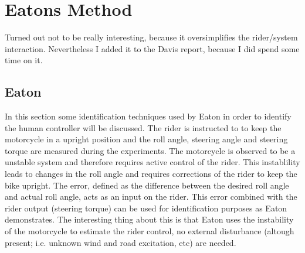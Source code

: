 \chapter{Eatons Method}
Turned out not to be really interesting, because it oversimplifies the rider/system interaction. Nevertheless I added it to the Davis report, because I did spend some time on it.
\section{Eaton}
In this section some identification techniques used by Eaton in order to identify the human controller will be discussed. The rider is instructed to to keep the motorcycle in a upright position and the roll angle, steering angle and steering torque are measured during the experiments. The motorcycle is observed to be a unstable system and therefore requires active control of the rider. This instablility leads to changes in the roll angle and requires corrections of the rider to keep the bike upright. The error, defined as the difference between the desired roll angle and actual roll angle, acts as an input on the rider. This error combined with the rider output (steering torque) can be used for identification purposes as Eaton demonstrates. The interesting thing about this is that Eaton uses the instability of the motorcycle to estimate the rider control, no external disturbance (altough present; i.e. unknown wind and road excitation, etc) are needed. 
